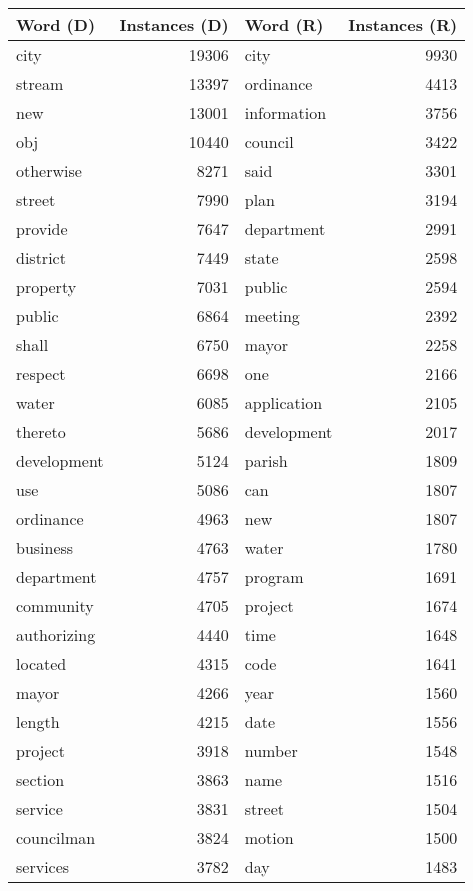 \begin{table}[ht]
\centering
\begingroup\fontsize{9pt}{10pt}\selectfont
\begin{tabular}{lrlr}
  \hline
Word (D) & Instances (D) & Word (R) & Instances (R) \\ 
  \hline
city & 19306 & city & 9930 \\ 
  stream & 13397 & ordinance & 4413 \\ 
  new & 13001 & information & 3756 \\ 
  obj & 10440 & council & 3422 \\ 
  otherwise & 8271 & said & 3301 \\ 
  street & 7990 & plan & 3194 \\ 
  provide & 7647 & department & 2991 \\ 
  district & 7449 & state & 2598 \\ 
  property & 7031 & public & 2594 \\ 
  public & 6864 & meeting & 2392 \\ 
  shall & 6750 & mayor & 2258 \\ 
  respect & 6698 & one & 2166 \\ 
  water & 6085 & application & 2105 \\ 
  thereto & 5686 & development & 2017 \\ 
  development & 5124 & parish & 1809 \\ 
  use & 5086 & can & 1807 \\ 
  ordinance & 4963 & new & 1807 \\ 
  business & 4763 & water & 1780 \\ 
  department & 4757 & program & 1691 \\ 
  community & 4705 & project & 1674 \\ 
  authorizing & 4440 & time & 1648 \\ 
  located & 4315 & code & 1641 \\ 
  mayor & 4266 & year & 1560 \\ 
  length & 4215 & date & 1556 \\ 
  project & 3918 & number & 1548 \\ 
  section & 3863 & name & 1516 \\ 
  service & 3831 & street & 1504 \\ 
  councilman & 3824 & motion & 1500 \\ 
  services & 3782 & day & 1483 \\ 

\end{tabular}
\end{table}
